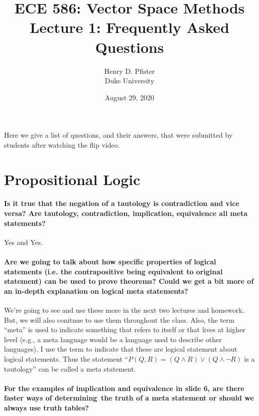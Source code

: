 \documentclass[10pt,english]{article}
\begin{document}
\title{ECE 586: Vector Space Methods \\ Lecture 1: Frequently Asked Questions}
\author{Henry D. Pfister \\ Duke University}
\date{August 29, 2020}

\maketitle

Here we give a list of questions, and their answers, that were submitted by students after watching the flip video.

\section{Propositional Logic}


\paragraph{Is it true that the negation of a tautology is contradiction and vice versa? Are tautology, contradiction, implication, equivalence all meta statements?}

Yes and Yes.

\paragraph{Are we going to talk about how specific properties of logical statements (i.e. the contrapositive being equivalent to original statement) can be used to prove theorems? Could we get a bit more of an in-depth explanation on logical meta statements?}

We're going to see and use these more in the next two lectures and homework.  But, we will also conitnue to use them throughout the class.
Also, the term ``meta'' is used to indicate something that refers to itself or that lives at higher level (e.g., a meta language would be a language used to describe other languages).
I use the term to indicate that these are logical statement about logical statements.
Thus the statement ``$P(Q,R) = (Q \wedge R) \vee (Q \wedge \neg R)$ is a tautology'' can be called a meta statement.

\paragraph{For the examples of implication and equivalence in slide 6, are there faster ways of determining the truth of a meta statement or should we always use truth tables?}
\end{document}
